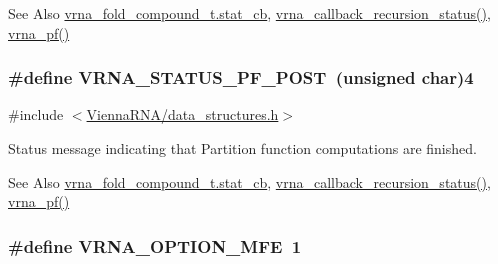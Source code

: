 \begin{DoxySeeAlso}{See Also}
\hyperlink{group__fold__compound_a87a83f6795b569000efcbe65acc3dd81}{vrna\-\_\-fold\-\_\-compound\-\_\-t.\-stat\-\_\-cb}, \hyperlink{group__fold__compound_ga9fafb3f0217e27339bb9faf61a03e723}{vrna\-\_\-callback\-\_\-recursion\-\_\-status()}, \hyperlink{group__pf__fold_ga29e256d688ad221b78d37f427e0e99bc}{vrna\-\_\-pf()} 
\end{DoxySeeAlso}
\hypertarget{group__fold__compound_ga1c6fa243533fd026e50f7d595eaaa565}{
\subsubsection[{V\-R\-N\-A\-\_\-\-S\-T\-A\-T\-U\-S\-\_\-\-P\-F\-\_\-\-P\-O\-S\-T}]{\setlength{\rightskip}{0pt plus 5cm}\#define V\-R\-N\-A\-\_\-\-S\-T\-A\-T\-U\-S\-\_\-\-P\-F\-\_\-\-P\-O\-S\-T~(unsigned char)4}}\label{group__fold__compound_ga1c6fa243533fd026e50f7d595eaaa565}


{\ttfamily \#include $<$\hyperlink{data__structures_8h}{Vienna\-R\-N\-A/data\-\_\-structures.\-h}$>$}



Status message indicating that Partition function computations are finished. 

\begin{DoxySeeAlso}{See Also}
\hyperlink{group__fold__compound_a87a83f6795b569000efcbe65acc3dd81}{vrna\-\_\-fold\-\_\-compound\-\_\-t.\-stat\-\_\-cb}, \hyperlink{group__fold__compound_ga9fafb3f0217e27339bb9faf61a03e723}{vrna\-\_\-callback\-\_\-recursion\-\_\-status()}, \hyperlink{group__pf__fold_ga29e256d688ad221b78d37f427e0e99bc}{vrna\-\_\-pf()} 
\end{DoxySeeAlso}
\hypertarget{group__fold__compound_gae63be9127fe7dcc1f9bb14f5bb1064ee}{
\subsubsection[{V\-R\-N\-A\-\_\-\-O\-P\-T\-I\-O\-N\-\_\-\-M\-F\-E}]{\setlength{\rightskip}{0pt plus 5cm}\#define V\-R\-N\-A\-\_\-\-O\-P\-T\-I\-O\-N\-\_\-\-M\-F\-E~1}}\label{group__fold__compound_gae63be9127fe7dcc1f9bb14f5bb1064ee}



